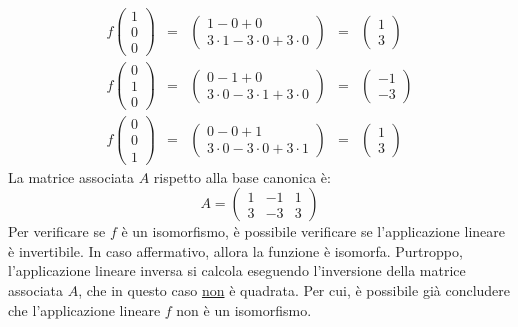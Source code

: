 \documentclass[a4paper]{article}
\begin{document}
	\begin{equation*}
		\begin{array}{lllll}
			f\begin{pmatrix}
				1 \\ 0 \\ 0
			\end{pmatrix} &=&
			\begin{pmatrix}
				1 - 0 + 0 \\
				3 \cdot 1 - 3 \cdot 0 + 3 \cdot 0
			\end{pmatrix} &=&
			\begin{pmatrix}
				1 \\ 3
			\end{pmatrix} \\ [1.8em]
			
			f\begin{pmatrix}
				0 \\ 1 \\ 0
			\end{pmatrix} &=&
			\begin{pmatrix}
				0 - 1 + 0 \\
				3 \cdot 0 - 3 \cdot 1 + 3 \cdot 0
			\end{pmatrix} &=&
			\begin{pmatrix}
				-1 \\ -3
			\end{pmatrix} \\ [1.8em]
			
			f\begin{pmatrix}
				0 \\ 0 \\ 1
			\end{pmatrix} &=&
			\begin{pmatrix}
				0 - 0 + 1 \\
				3 \cdot 0 - 3 \cdot 0 + 3 \cdot 1
			\end{pmatrix} &=&
			\begin{pmatrix}
				1 \\ 3
			\end{pmatrix}
		\end{array}
	\end{equation*}
	La matrice associata $A$ rispetto alla base canonica è:
	\begin{equation*}
		A = \begin{pmatrix}
			1 & -1 & 1 \\
			3 & -3 & 3
		\end{pmatrix}
	\end{equation*}
	Per verificare se $f$ è un isomorfismo, è possibile verificare se l'applicazione lineare è invertibile. In caso affermativo, allora la funzione è isomorfa. Purtroppo, l'applicazione lineare inversa si calcola eseguendo l'inversione della matrice associata $A$, che in questo caso \underline{non} è quadrata. Per cui, è possibile già concludere che l'applicazione lineare $f$ non è un isomorfismo.
	
\end{document}
